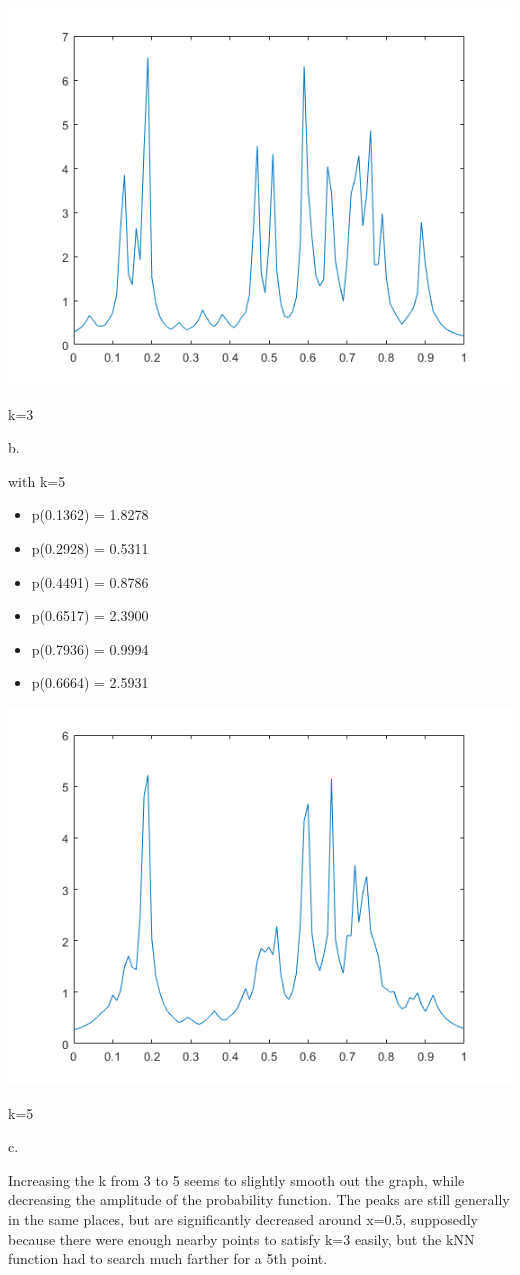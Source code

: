 \documentclass[a4paper]{article}
\begin{document}
\begin{center}
    \includegraphics[scale=1]{3-3a.png}
    \caption{k=3}
\end{center}

\noindent
b.

\noindent
with k=5
\begin{itemize}
    \item p(0.1362) = 1.8278
    \item p(0.2928) = 0.5311
    \item p(0.4491) = 0.8786
    \item p(0.6517) = 2.3900
    \item p(0.7936) = 0.9994
    \item p(0.6664) = 2.5931
\end{itemize}

\begin{center}
    \includegraphics[scale=1]{3-3b.png}
    \caption{k=5}
\end{center}

\noindent
c. 

\noindent
Increasing the k from 3 to 5 seems to slightly smooth out the graph, while decreasing the amplitude of the probability function. The peaks are still generally in the same places, but are significantly decreased around x=0.5, supposedly because there were enough nearby points to satisfy k=3 easily, but the kNN function had to search much farther for a 5th point.
\end{document}
